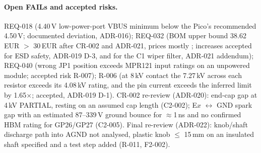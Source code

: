 \paragraph{Open FAILs and accepted risks.} REQ-018 (4.40\,V low-power-port VBUS minimum below the Pico's recommended 4.50\,V; documented deviation, ADR-016); REQ-032 (BOM upper bound
38.62\,EUR $>$ 30\,EUR after CR-002 and ADR-021, prices mostly ;
increases accepted for ESD safety, ADR-019 D-3, and for the C1 wiper filter, ADR-021
addendum); REQ-040 (wrong JP1
position exceeds MPR121 input ratings on an unpowered module; accepted risk R-007);
R-006 (at 8\,kV contact the 7.27\,kV across each resistor exceeds its 4.08\,kV
rating, and the pin current exceeds the inferred limit by 1.65$\times$; accepted,
ADR-019 D-1). CR-002 re-review (ADR-020): end-cap gap at 4\,kV PARTIAL, resting on
an assumed cap length (C2-002); E$x$ $\leftrightarrow$ GND spark gap with an
estimated 87--339\,V ground bounce for $\approx$1\,ns and no confirmed HBM rating for
GP26/GP27 (C2-005). Final re-review (ADR-022): knob/shaft discharge path into AGND
not analysed, plastic knob $\le$ 15\,mm on an insulated shaft specified and a test
step added (R-011, F2-002).

